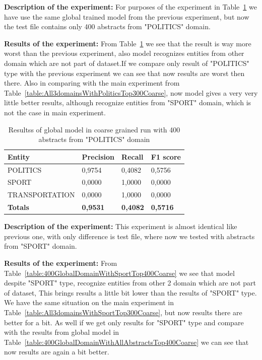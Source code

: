 \documentclass[thesis=M,english]{FITthesis}[2018/05/30]
\begin{document}
\textbf{Description of the experiment:} For purposes of the experiment in Table~\ref{table:400GlobalDomainWithPoliticsTop400Coarse} we have use the same global trained model from the previous experiment, but now the test file contains only 400 abstracts from "POLITICS" domain. 

\textbf{Results of the experiment:} From Table~\ref{table:400GlobalDomainWithPoliticsTop400Coarse} we see that the result is way more worst than the previous experiment, also model recognizes entities from other domain which are not part of dataset.If we compare only result of "POLITICS" type with the previous experiment we can see that now results are worst then there. Also in comparing with the main experiment from Table~\ref{table:All3domainsWithPoliticsTop300Coarse}, now model gives a very very little better results, although recognize entities from "SPORT" domain, which is not the case in main experiment.

	\begin{table}[H]\centering
		\begin{tabular}{|l|l|l|l|}
			\hline {\textbf{Entity}} & {\textbf{Precision}} & {\textbf{Recall}} & {\textbf{F1 score}}\\\hline
				POLITICS & 0,9754 & 0,4082 & 0,5756\\
				SPORT & 0,0000 & 1,0000 & 0,0000\\
				TRANSPORTATION & 0,0000 & 1,0000 & 0,0000\\\hline
				\textbf{Totals} & \textbf{0,9531} & \textbf{0,4082} & \textbf{0,5716}\\\hline
		\end{tabular}
		\caption{Resultss of global model in coarse grained run with 400 abstracts from "POLITICS" domain \label{table:400GlobalDomainWithPoliticsTop400Coarse}}
	\end{table}


\textbf{Description of the experiment:} This experiment is almost identical like previous one, with only difference is test file, where now we tested with abstracts from "SPORT" domain.

\textbf{Results of the experiment:} From Table~\ref{table:400GlobalDomainWithSportTop400Coarse} we see that model despite "SPORT" type, recognize entities from other 2 domain which are not part of dataset, This brings results a little bit lower than the results of "SPORT" type. We have the same situation on the main experiment in Table~\ref{table:All3domainsWithSportTop300Coarse}, but now results there are better for a bit. As well if we get only results for "SPORT" type and compare with the results from global model in Table~\ref{table:400GlobalDomainWithAllAbstractsTop400Coarse} we can see that now results are again a bit better.
\end{document}
